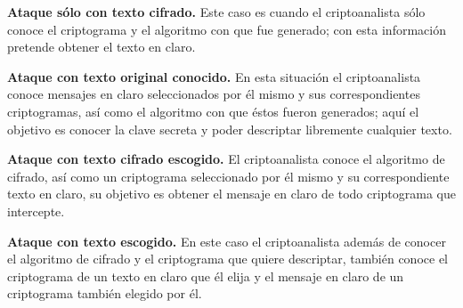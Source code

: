 \textbf{Ataque sólo con texto cifrado. }
Este caso es cuando el criptoanalista sólo conoce el criptograma y el algoritmo con que fue generado; con esta información pretende obtener el texto en claro.

\textbf{Ataque con texto original conocido. }
En esta situación el criptoanalista conoce mensajes en claro seleccionados por él mismo y sus correspondientes criptogramas, así como el algoritmo con que éstos fueron generados; aquí el objetivo es conocer la clave secreta y poder descriptar libremente cualquier texto.

\textbf{Ataque con texto cifrado escogido. }
El criptoanalista conoce el algoritmo de cifrado, así como un criptograma seleccionado por él mismo y su correspondiente texto en claro, su objetivo es obtener el mensaje en claro de todo criptograma que intercepte.

\textbf{Ataque con texto escogido. }
En este caso el criptoanalista además de conocer el algoritmo de cifrado y el criptograma que quiere descriptar, también conoce el criptograma de un texto en claro que él elija y el mensaje en claro de un criptograma también elegido por él. ~\cite{ataques}






